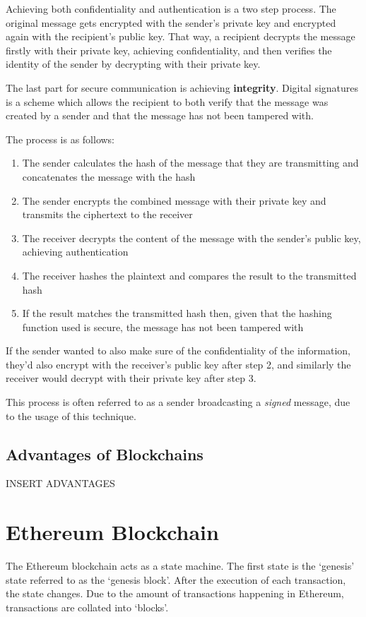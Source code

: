 Achieving both confidentiality and authentication is a two step process. The original message gets encrypted with the sender's private key and encrypted again with the recipient's public key. That way, a recipient decrypts the message firstly with their private key, achieving confidentiality, and then verifies the identity of the sender by decrypting with their private key.

The last part for secure communication is achieving \textbf{integrity}. Digital signatures is a scheme which allows the recipient to both verify that the message was created by a sender and that the message has not been tampered with. 

The process is as follows:
\begin{enumerate}
    \item The sender calculates the hash of the message that they are transmitting and concatenates the message with the hash
    \item The sender encrypts the combined message with their private key and transmits the ciphertext to the receiver  
    \item The receiver decrypts the content of the message with the sender's public key, achieving authentication
    \item The receiver hashes the plaintext and compares the result to the transmitted hash
    \item If the result matches the transmitted hash  then, given that the hashing function used is secure,
    the message has not been tampered with
\end{enumerate}

If the sender wanted to also make sure of the confidentiality of the information, they'd also encrypt with the receiver's public key after step 2, and similarly the receiver would decrypt with their private key after step 3. 

This process is often referred to as a sender broadcasting a \textit{signed} message, due to the usage of this technique.


\subsection{Advantages of Blockchains}
INSERT ADVANTAGES

\section{Ethereum Blockchain}
The Ethereum blockchain acts as a state machine. The first state is the `genesis' state referred to as the `genesis block'. After the execution of each transaction, the state changes. Due to the amount of transactions happening in Ethereum, transactions are collated into `blocks'. 

